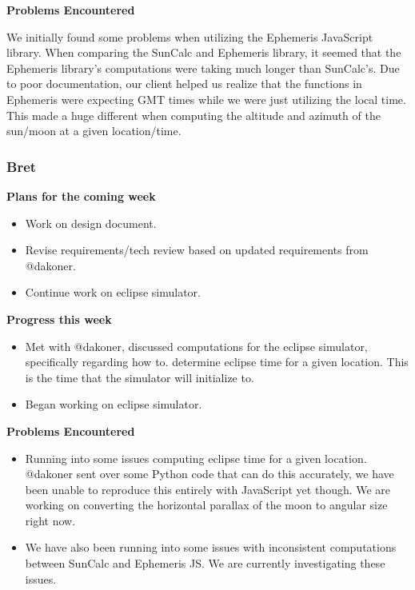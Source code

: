 \documentclass[10pt, onecolumn, draftclsnofoot, letterpaper, compsoc]{IEEEtran}
\begin{document}
    \noindent \textbf{Problems Encountered}

    We initially found some problems when utilizing the Ephemeris JavaScript
    library. When comparing the SunCalc and Ephemeris library, it seemed that the
    Ephemeris library's computations were taking much longer than SunCalc's. Due to
    poor documentation, our client helped us realize that the functions in Ephemeris
    were expecting GMT times while we were just utilizing the local time. This made a
    huge different when computing the altitude and azimuth of the sun/moon at a given
    location/time.

    \subsubsection{Bret}

    \noindent \textbf{Plans for the coming week}

    \begin{itemize}

    \item Work on design document.
    \item Revise requirements/tech review based on updated requirements from @dakoner.
    \item Continue work on eclipse simulator.

    \end{itemize}

    \noindent \textbf{Progress this week}

    \begin{itemize}

    \item Met with @dakoner, discussed computations for the eclipse simulator, specifically regarding how to.
      determine eclipse time for a given location. This is the time that the simulator will initialize to.
    \item Began working on eclipse simulator.

    \end{itemize}

    \noindent \textbf{Problems Encountered}

    \begin{itemize}

    \item Running into some issues computing eclipse time for a given location. @dakoner sent over some Python
      code that can do this accurately, we have been unable to reproduce this entirely with JavaScript yet though.
      We are working on converting the horizontal parallax of the moon to angular size right now.
    \item We have also been running into some issues with inconsistent computations between SunCalc and Ephemeris JS.
      We are currently investigating these issues.

    \end{itemize}
\end{document}
